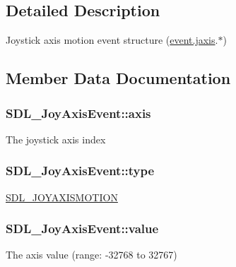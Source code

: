 \subsection{Detailed Description}
Joystick axis motion event structure (\hyperlink{unionSDL__Event_ac4611acd0e9c675e67dc20919f0accb4}{event.\+jaxis}.$\ast$) 

\subsection{Member Data Documentation}
\hypertarget{structSDL__JoyAxisEvent_a0beac2fb161e45771c424bd0b6daeabb}{}
\subsubsection[{axis}]{ S\+D\+L\+\_\+\+Joy\+Axis\+Event\+::axis}\label{structSDL__JoyAxisEvent_a0beac2fb161e45771c424bd0b6daeabb}
The joystick axis index \hypertarget{structSDL__JoyAxisEvent_aed1c873fb90ba58194e65f972933c67d}{}
\subsubsection[{type}]{ S\+D\+L\+\_\+\+Joy\+Axis\+Event\+::type}\label{structSDL__JoyAxisEvent_aed1c873fb90ba58194e65f972933c67d}
\hyperlink{SDL__events_8h_a3b589e89be6b35c02e0dd34a55f3fccaaf0803b3f8a12de3d85f81ebd7b514cd1}{S\+D\+L\+\_\+\+J\+O\+Y\+A\+X\+I\+S\+M\+O\+T\+I\+O\+N} \hypertarget{structSDL__JoyAxisEvent_a53ee73e7c367934dd6edb69963be5556}{}
\subsubsection[{value}]{ S\+D\+L\+\_\+\+Joy\+Axis\+Event\+::value}\label{structSDL__JoyAxisEvent_a53ee73e7c367934dd6edb69963be5556}
The axis value (range\+: -\/32768 to 32767) \hypertarget{structSDL__JoyAxisEvent_a965719f4703a7091bcc5f07f79fcf7e1}{}

